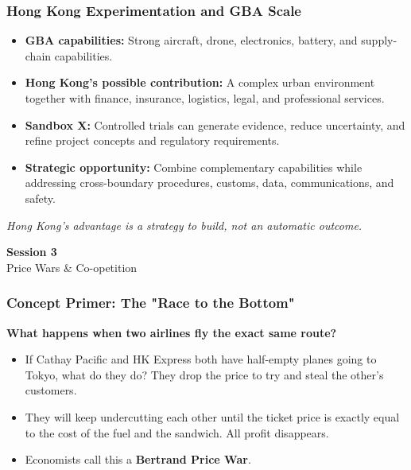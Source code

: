 \documentclass{beamer}
\begin{document}
\begin{frame}[t]
\frametitle{Hong Kong Experimentation and GBA Scale}
\begin{itemize}
\item \textbf{GBA capabilities:} Strong aircraft, drone, electronics, battery, and supply-chain capabilities.
\item \textbf{Hong Kong's possible contribution:} A complex urban environment together with finance, insurance, logistics, legal, and professional services.
\item \textbf{Sandbox X:} Controlled trials can generate evidence, reduce uncertainty, and refine project concepts and regulatory requirements.
\item \textbf{Strategic opportunity:} Combine complementary capabilities while addressing cross-boundary procedures, customs, data, communications, and safety.
\end{itemize}
\textit{Hong Kong's advantage is a strategy to build, not an automatic outcome.}
\end{frame}

\begin{frame}[c]
  \begin{center}
    \huge\color{cuhkpurple}\textbf{Session 3}\\
    \vspace{0.5cm}
    \Large Price Wars \& Co-opetition
  \end{center}
\end{frame}

\begin{frame}[t]
  \frametitle{Concept Primer: The "Race to the Bottom"}
  
  \textbf{What happens when two airlines fly the exact same route?}
  \begin{itemize}
      \item If Cathay Pacific and HK Express both have half-empty planes going to Tokyo, what do they do? They drop the price to try and steal the other's customers.
      \item They will keep undercutting each other until the ticket price is exactly equal to the cost of the fuel and the sandwich. All profit disappears.
      \item Economists call this a \textbf{Bertrand Price War}.
  \end{itemize}


\end{frame}
\end{document}
